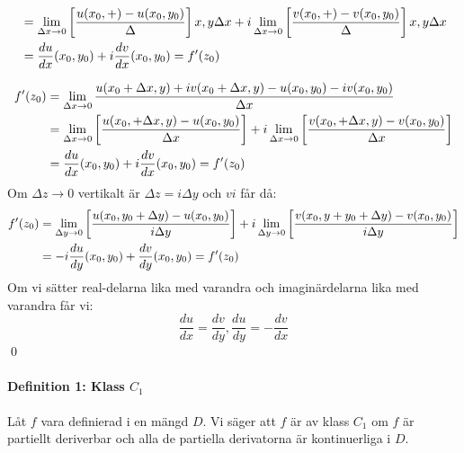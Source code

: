 \newcommand{\uberBracket}[6] {
	\begin{align*}
		&= \bracketDelta #2 u #3 #4 + i \bracketDelta #2 v #3 #4 \\
		&= #5 \frac {d u} {d #2} (#2_0, #6_0) + i \frac {dv} {d #2} (x_0, y_0) = f'(z_0)
	\end{align*}
}

\uberBracket{
	f'(z_0) &= \lim_{\xtz} \frac {
		u(x_0 + \Delta x, y) + iv(x_0 + \Delta x, y) - u(x_0, y_0) - iv(x_0, y_0)
		} {
			\Delta x
		} \\
} {x} {+ \Delta x,y} {\Delta x} {} {y}

\begin{align*}
	f'(z_0) &=  \lim_{\Delta x \to 0} \frac {
		u(x_0 + \Delta x, y) + iv(x_0 + \Delta x, y) - u(x_0, y_0) - iv(x_0, y_0)
	} {
		\Delta x
	} \\
	&= \lim_{\Delta x \to 0} \left [ \frac { u(x_0, + \Delta x,y) - u(x_0, y_0) } { \Delta x } \right ] 
	+ i \lim_{\Delta x \to 0} \left [ \frac { v(x_0, + \Delta x,y) - v(x_0, y_0) } { \Delta x } \right ] \\
	&= \frac {d u} {d x} (x_0, y_0) + i \frac {d v} {d x} (x_0, y_0) = f'(z_0)
\end{align*}
Om $\Delta z \to 0$ vertikalt är $\Delta z = i \Delta y$ och $vi$ får då:
\begin{align*}
	f'(z_0)
	&= \lim_{\Delta y \to 0} \left [ \frac { u(x_0, y_0 + \Delta y) - u(x_0, y_0) } { i \Delta y } \right ]
	+ i \lim_{\Delta y \to 0} \left [ \frac { v(x_0, y + y_0 + \Delta y) - v(x_0, y_0) } { i\Delta y } \right ] \\
	&= - i \frac {d u} {d y} (x_0, y_0) + \frac {d v} {d y} (x_0, y_0) = f'(z_0)
\end{align*}
Om vi sätter real-delarna lika med varandra och imaginärdelarna lika med varandra får vi:
$$\frac {d u} {d x} = \frac {d v} {d y}, \frac {d u} {d y} = -
	\frac {d v} {d x}$$
\hfill \qed

\paragraph{Definition 1: Klass $C_1$}
Låt $f$ vara definierad i en mängd $D$. Vi säger att $f$ är av klass $C_1$ om $f$ är partiellt deriverbar och
alla de partiella derivatorna är kontinuerliga i $D$.\\
\\
